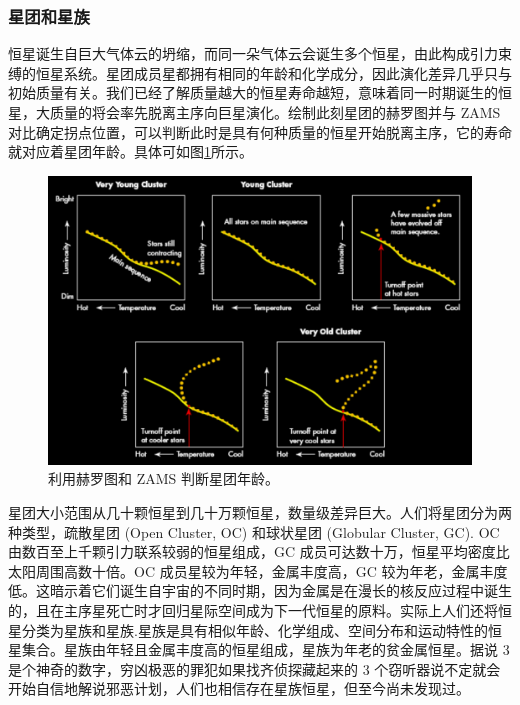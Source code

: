 \documentclass[../天体物理基础.tex]{subfiles}
\begin{document}
\subsubsection{星团和星族}
恒星诞生自巨大气体云的坍缩，而同一朵气体云会诞生多个恒星，由此构成引力束缚的恒星系统。星团成员星都拥有相同的年龄和化学成分，因此演化差异几乎只与初始质量有关。我们已经了解质量越大的恒星寿命越短，意味着同一时期诞生的恒星，大质量的将会率先脱离主序向巨星演化。绘制此刻星团的赫罗图并与 ZAMS 对比确定拐点位置，可以判断此时是具有何种质量的恒星开始脱离主序，它的寿命就对应着星团年龄。具体可如图\ref{利用赫罗图和 ZAMS 判断星团年龄。}所示。
\begin{figure}[!htbp]
\centering
\includegraphics[width=12cm]{figures/figure1_17.png}
\captionsetup{justification=raggedright, singlelinecheck=false}
\caption{利用赫罗图和 ZAMS 判断星团年龄。}
\label{利用赫罗图和 ZAMS 判断星团年龄。}
\end{figure}

星团大小范围从几十颗恒星到几十万颗恒星，数量级差异巨大。人们将星团分为两种类型，疏散星团 (Open Cluster, OC) 和球状星团 (Globular Cluster, GC). OC 由数百至上千颗引力联系较弱的恒星组成，GC 成员可达数十万，恒星平均密度比太阳周围高数十倍。OC 成员星较为年轻，金属丰度高，GC 较为年老，金属丰度低。这暗示着它们诞生自宇宙的不同时期，因为金属是在漫长的核反应过程中诞生的，且在主序星死亡时才回归星际空间成为下一代恒星的原料。实际上人们还将恒星分类为星族\uppercase\expandafter{}和星族\uppercase\expandafter{}.星族是具有相似年龄、化学组成、空间分布和运动特性的恒星集合。星族\uppercase\expandafter{}由年轻且金属丰度高的恒星组成，星族\uppercase\expandafter{}为年老的贫金属恒星。据说 3 是个神奇的数字，穷凶极恶的罪犯如果找齐侦探藏起来的 3 个窃听器说不定就会开始自信地解说邪恶计划，人们也相信存在星族\uppercase\expandafter{}恒星，但至今尚未发现过。
\end{document}
